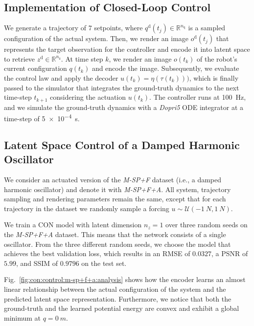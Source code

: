 \subsection{Implementation of Closed-Loop Control}
We generate a trajectory of $7$ setpoints, where $q^\mathrm{d}(t_j) \in \mathbb{R}^{n_\mathrm{q}}$ is a sampled configuration of the actual system.
Then, we render an image $o^\mathrm{d}(t_j)$ that represents the target observation for the controller and encode it into latent space to retrieve $z^\mathrm{d} \in \mathbb{R}^{n_\mathrm{z}}$.
At time step $k$, we render an image $o(t_k)$ of the robot's current configuration $q(t_k)$ and encode the image. 
Subsequently, we evaluate the control law and apply the decoder $u(t_k) = \eta(\tau(t_k)))$, which is finally passed to the simulator that integrates the ground-truth dynamics to the next time-step $t_{k+1}$ considering the actuation $u(t_k)$.
The controller runs at \SI{100}{Hz}, and we simulate the ground-truth dynamics with a \emph{Dopri5} \gls{ODE} integrator at a time-step of \num{5e-4}~\si{s}.

\subsection{Latent Space Control of a Damped Harmonic Oscillator}

We consider an actuated version of the \emph{M-SP+F} dataset (i.e., a damped harmonic oscillator) and denote it with \emph{M-SP+F+A}. All system, trajectory sampling and rendering parameters remain the same, except that for each trajectory in the dataset we randomly sample a forcing $u \sim \mathcal{U}(-\SI{1}{N}, \SI{1}{N})$.

We train a \gls{CON} model with latent dimension $n_z = 1$ over three random seeds on the \emph{M-SP+F+A} dataset. This means that the network consists of a single oscillator.
From the three different random seeds, we choose the model that achieves the best validation loss, which results in an RMSE of $0.0327$, a PSNR of $5.99$, and SSIM of $0.9796$ on the test set.

Fig.~\ref{fig:con:control:m-sp+f+a:analysis} shows how the encoder learns an almost linear relationship between the actual configuration of the system and the predicted latent space representation. Furthermore, we notice that both the ground-truth and the learned potential energy are convex and exhibit a global minimum at $q=\SI{0}{m}$.


